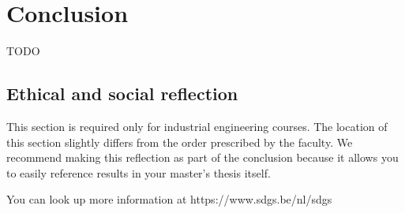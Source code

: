 \chapter*{Conclusion}

TODO

\section*{Ethical and social reflection}

This section is required only for industrial engineering courses. The location of this section slightly differs from the order prescribed by the faculty. We recommend making this reflection as part of the conclusion because it allows you to easily reference results in your master's thesis itself.

You can look up more information at https://www.sdgs.be/nl/sdgs
